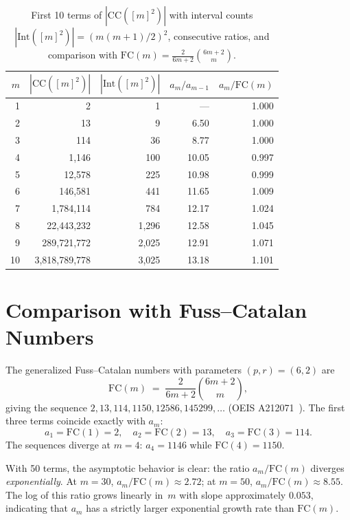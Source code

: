 \documentclass[11pt,a4paper]{article}
\theoremstyle{plain}
\theoremstyle{definition}
\theoremstyle{remark}
\newcommand{\CC}{\mathrm{CC}}
\begin{document}
\begin{table}[h]
\centering
\begin{tabular}{r r r r r}
\toprule
$m$ & $|\CC([m]^2)|$ & $|\mathrm{Int}([m]^2)|$ & $a_m / a_{m-1}$ & $a_m / \mathrm{FC}(m)$ \\
\midrule
1 & 2 & 1 & --- & 1.000 \\
2 & 13 & 9 & 6.50 & 1.000 \\
3 & 114 & 36 & 8.77 & 1.000 \\
4 & 1{,}146 & 100 & 10.05 & 0.997 \\
5 & 12{,}578 & 225 & 10.98 & 0.999 \\
6 & 146{,}581 & 441 & 11.65 & 1.009 \\
7 & 1{,}784{,}114 & 784 & 12.17 & 1.024 \\
8 & 22{,}443{,}232 & 1{,}296 & 12.58 & 1.045 \\
9 & 289{,}721{,}772 & 2{,}025 & 12.91 & 1.071 \\
10 & 3{,}818{,}789{,}778 & 3{,}025 & 13.18 & 1.101 \\
\bottomrule
\end{tabular}
\caption{First 10 terms of $|\CC([m]^2)|$ with interval counts $|\mathrm{Int}([m]^2)| = (m(m+1)/2)^2$, consecutive ratios, and comparison with $\mathrm{FC}(m) = \frac{2}{6m+2}\binom{6m+2}{m}$.}
\label{tab:sequence}
\end{table}


\section{Comparison with Fuss--Catalan Numbers}\label{sec:catalan}

The generalized Fuss--Catalan numbers with parameters $(p, r) = (6, 2)$ are
\[
\mathrm{FC}(m) \;=\; \frac{2}{6m+2}\binom{6m+2}{m},
\]
giving the sequence $2, 13, 114, 1150, 12586, 145299, \ldots$ (OEIS A212071~\cite{oeis}).
The first three terms coincide exactly with $a_m$:
\[
a_1 = \mathrm{FC}(1) = 2, \quad a_2 = \mathrm{FC}(2) = 13, \quad a_3 = \mathrm{FC}(3) = 114.
\]
The sequences diverge at $m = 4$: $a_4 = 1146$ while $\mathrm{FC}(4) = 1150$.

With 50 terms, the asymptotic behavior is clear: the ratio $a_m / \mathrm{FC}(m)$ diverges \emph{exponentially}.
At $m = 30$, $a_m / \mathrm{FC}(m) \approx 2.72$; at $m = 50$, $a_m / \mathrm{FC}(m) \approx 8.55$.
The log of this ratio grows linearly in~$m$ with slope approximately $0.053$, indicating that $a_m$ has a strictly larger exponential growth rate than $\mathrm{FC}(m)$.
\end{document}
